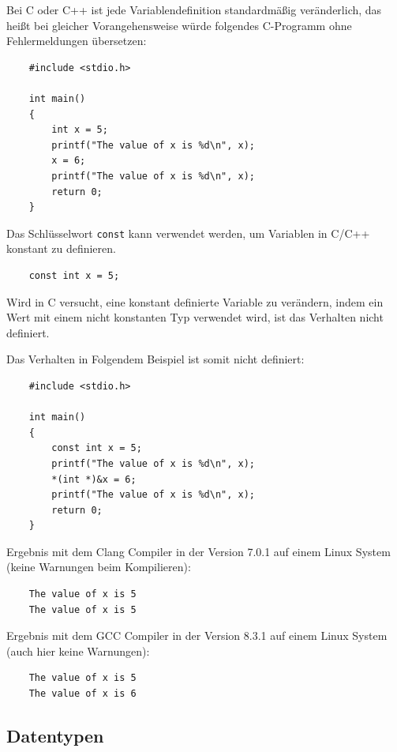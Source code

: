 Bei C oder C++ ist jede Variablendefinition standardmäßig veränderlich, das heißt bei gleicher Vorangehensweise würde folgendes C-Programm ohne Fehlermeldungen übersetzen:

\begin{lstlisting}
    #include <stdio.h>

    int main()
    {
        int x = 5;
        printf("The value of x is %d\n", x);
        x = 6;
        printf("The value of x is %d\n", x);
        return 0;
    }    
\end{lstlisting}

Das Schlüsselwort \verb"const" kann verwendet werden, um Variablen in C/C++ konstant zu definieren.

\begin{lstlisting}
    const int x = 5;
\end{lstlisting}

Wird in C versucht, eine konstant definierte Variable zu verändern, indem ein Wert mit einem nicht konstanten Typ verwendet wird, ist das Verhalten nicht definiert. \cite[p.~87]{ISO:9899:2017}

Das Verhalten in Folgendem Beispiel ist somit nicht definiert:

\begin{lstlisting}
    #include <stdio.h>

    int main()
    {
        const int x = 5;
        printf("The value of x is %d\n", x);
        *(int *)&x = 6;
        printf("The value of x is %d\n", x);
        return 0;
    }
\end{lstlisting}

Ergebnis mit dem Clang Compiler in der Version 7.0.1 auf einem Linux System (keine Warnungen beim Kompilieren):

\begin{lstlisting}
    The value of x is 5
    The value of x is 5
\end{lstlisting}

Ergebnis mit dem GCC Compiler in der Version 8.3.1 auf einem Linux System (auch hier keine Warnungen):

\begin{lstlisting}
    The value of x is 5
    The value of x is 6
\end{lstlisting}

\subsection{Datentypen}\label{chap:datatypes}

